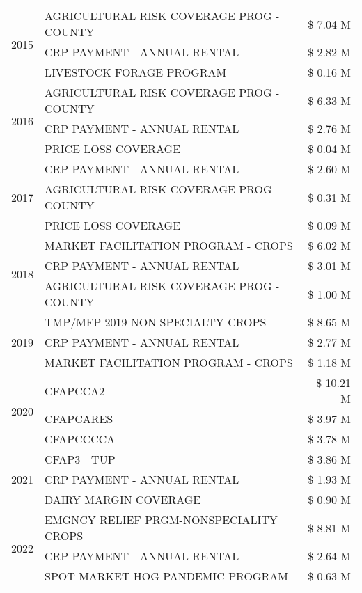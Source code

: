 \begin{tabular}{llr}
\cline{1-3}
\multirow[t]{3}{*}{2015} & AGRICULTURAL RISK COVERAGE PROG - COUNTY & \$ 7.04 M \\
 & CRP PAYMENT - ANNUAL RENTAL & \$ 2.82 M \\
 & LIVESTOCK FORAGE PROGRAM & \$ 0.16 M \\
\cline{1-3}
\multirow[t]{3}{*}{2016} & AGRICULTURAL RISK COVERAGE PROG - COUNTY & \$ 6.33 M \\
 & CRP PAYMENT - ANNUAL RENTAL & \$ 2.76 M \\
 & PRICE LOSS COVERAGE & \$ 0.04 M \\
\cline{1-3}
\multirow[t]{3}{*}{2017} & CRP PAYMENT - ANNUAL RENTAL & \$ 2.60 M \\
 & AGRICULTURAL RISK COVERAGE PROG - COUNTY & \$ 0.31 M \\
 & PRICE LOSS COVERAGE & \$ 0.09 M \\
\cline{1-3}
\multirow[t]{3}{*}{2018} & MARKET FACILITATION PROGRAM - CROPS & \$ 6.02 M \\
 & CRP PAYMENT - ANNUAL RENTAL & \$ 3.01 M \\
 & AGRICULTURAL RISK COVERAGE PROG - COUNTY & \$ 1.00 M \\
\cline{1-3}
\multirow[t]{3}{*}{2019} & TMP/MFP 2019 NON SPECIALTY CROPS & \$ 8.65 M \\
 & CRP PAYMENT - ANNUAL RENTAL & \$ 2.77 M \\
 & MARKET FACILITATION PROGRAM - CROPS & \$ 1.18 M \\
\cline{1-3}
\multirow[t]{3}{*}{2020} & CFAPCCA2 & \$ 10.21 M \\
 & CFAPCARES & \$ 3.97 M \\
 & CFAPCCCCA & \$ 3.78 M \\
\cline{1-3}
\multirow[t]{3}{*}{2021} & CFAP3 - TUP & \$ 3.86 M \\
 & CRP PAYMENT - ANNUAL RENTAL & \$ 1.93 M \\
 & DAIRY MARGIN COVERAGE & \$ 0.90 M \\
\cline{1-3}
\multirow[t]{3}{*}{2022} & EMGNCY RELIEF PRGM-NONSPECIALITY CROPS & \$ 8.81 M \\
 & CRP PAYMENT - ANNUAL RENTAL & \$ 2.64 M \\
 & SPOT MARKET HOG PANDEMIC PROGRAM & \$ 0.63 M \\
\cline{1-3}
\bottomrule
\end{tabular}
